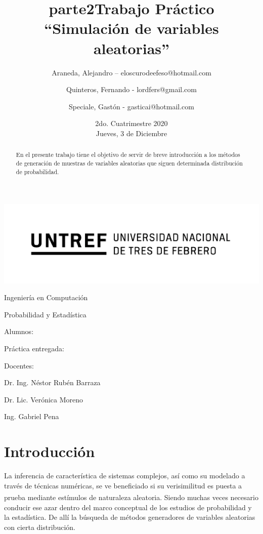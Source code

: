 \documentclass[11pt]{article}
\title{parte2}
\title{Trabajo Práctico\\``Simulación de variables aleatorias''}
\author{Araneda, Alejandro – eloscurodeefeso@hotmail.com%
\and Quinteros, Fernando - lordfers@gmail.com%
\and Speciale, Gastón - gasticai@hotmail.com}
\date{2do. Cuatrimestre 2020\\Jueves, 3 de Diciembre}
\let\originalcite\cite
\renewcommand{\cite}[2][]{\textsuperscript{\originalcite{#2}}}
\def\teacher{Dr. Ing. Néstor Rubén Barraza%
\and Dr. Lic. Verónica Moreno%
\and Ing. Gabriel Pena}
\begin{document}
\begin{titlepage}
\makeatletter
\renewcommand\and\par
\edef\oldparskip{\the\parskip}
\centering
\includegraphics{logo.png}\par
{\Large Ingeniería en Computación \par}\vspace{0.5cm}
{\LARGE Probabilidad y Estadística \par}\vfill
{\huge \@title \par}\vfill
Alumnos:\par\vspace{\oldparskip}
\setlength\parskip{0pt}\@author\setlength\parskip{\oldparskip}\vfill
Práctica entregada:\par
\@date\vfill
Docentes:\par\vspace{\oldparskip}
\setlength\parskip{0pt}\teacher\setlength\parskip{\oldparskip}\vspace{1cm}
\makeatother
\end{titlepage}

\begin{abstract}
    En el presente trabajo tiene el objetivo de servir de breve
    introducción a los métodos de generación de muestras de 
    variables aleatorias que siguen determinada distribución 
    de probabilidad.
\end{abstract}

\section{Introducción}

La inferencia de característica de sistemas complejos, así como
su modelado a través de técnicas numéricas, se ve beneficiado
si su verisimilitud es puesta a prueba mediante estímulos de 
naturaleza aleatoria\cite{bib:dek}. Siendo muchas veces necesario conducir
ese azar dentro del marco conceptual de los estudios de 
probabilidad y la estadística. De allí la búsqueda de métodos 
generadores de variables aleatorias con cierta distribución.
\end{document}
